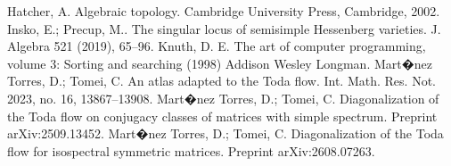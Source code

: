\documentclass[reqno]{amsart}
\begin{document}
\begin{thebibliography}{}
 Hatcher, A. Algebraic topology. Cambridge University Press, Cambridge, 2002.
  Insko, E.; Precup, M.. The singular locus of semisimple Hessenberg varieties. J. Algebra 521 (2019), 65--96.
 Knuth, D. E. The art of computer programming, volume 3: Sorting and searching (1998)  Addison Wesley Longman.
  Mart�nez Torres, D.; Tomei, C. An atlas adapted to the Toda flow. Int. Math. Res. Not. 2023, no. 16, 13867--13908.
Mart�nez Torres, D.; Tomei, C. Diagonalization of the Toda flow on conjugacy classes of matrices with simple spectrum. Preprint arXiv:2509.13452.
Mart�nez Torres, D.; Tomei, C. Diagonalization of the Toda flow for isospectral symmetric matrices. Preprint arXiv:2608.07263.




\end{thebibliography}
\end{document}
